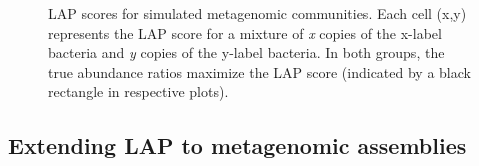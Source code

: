 \begin{figure}
\begin{center}

\hfil
{}
\end{center}
\renewcommand{\baselinestretch}{1}
\small\normalsize
\begin{quote}
\caption[LAP scores for simulated metagenomic communities.] {LAP scores for simulated metagenomic communities. Each cell (x,y) represents the LAP score for a mixture of \emph{x} copies of the x-label bacteria and \emph{y} copies of the y-label bacteria.  In both groups, the true abundance ratios maximize the LAP score (indicated by a black rectangle in respective plots). \label{fig:ref_abun}}
\end{quote}
\end{figure}
\renewcommand{\baselinestretch}{2}
\small\normalsize
\newpage

\subsection{Extending LAP to metagenomic assemblies}

